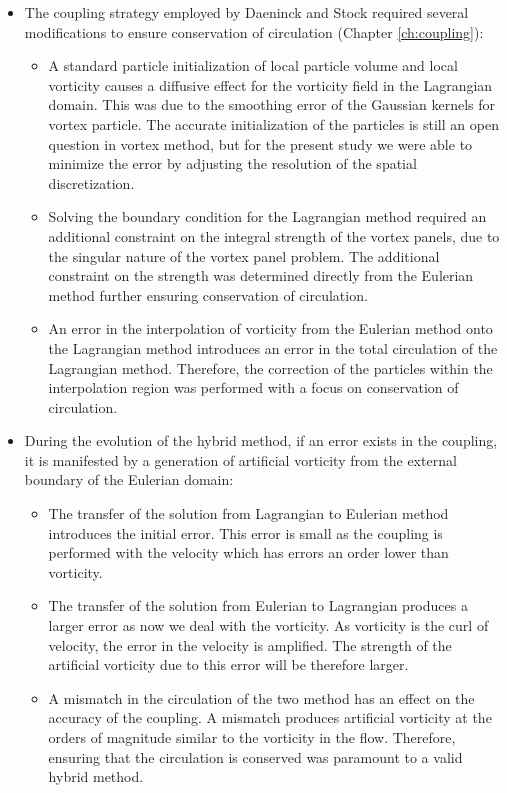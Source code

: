 \begin{itemize}

\item The coupling strategy employed by Daeninck and Stock required several modifications to ensure conservation of circulation (Chapter \ref{ch:coupling}):
	\begin{itemize}
	\item A standard particle initialization of local particle volume and local vorticity causes a diffusive effect for the vorticity field in the Lagrangian domain. This was due to the smoothing error of the Gaussian kernels for vortex particle. The accurate initialization of the particles is still an open question in vortex method, but for the present study we were able to minimize the error by adjusting the resolution of the spatial discretization. 

	\item Solving the boundary condition for the Lagrangian method required an additional constraint on the integral strength of the vortex panels, due to the singular nature of the vortex panel problem.  The additional constraint on the strength was determined directly from the Eulerian method further ensuring conservation of circulation.
	
	\item An error in the interpolation of vorticity from the Eulerian method onto the Lagrangian method introduces an error in the total circulation of the Lagrangian method. Therefore, the correction of the particles within the interpolation region was performed with a focus on conservation of circulation.
	\end{itemize}
	
\item During the evolution of the hybrid method, if an error exists in the coupling, it is manifested by a generation of artificial vorticity from the external boundary of the Eulerian domain:
	\begin{itemize}
	\item The transfer of the solution from Lagrangian to Eulerian method introduces the initial error. This error is small as the coupling is performed with the velocity which has errors an order lower than vorticity.
	\item The transfer of the solution from Eulerian to Lagrangian produces a larger error as now we deal with the vorticity. As vorticity is the curl of velocity, the error in the velocity is amplified. The strength of the artificial vorticity due to this error will be therefore larger.
	\item A mismatch in the circulation of the two method has an effect on the accuracy of the coupling. A mismatch produces artificial vorticity at the orders of magnitude similar to the vorticity in the flow. Therefore, ensuring that the circulation is conserved was paramount to a valid hybrid method.
	\end{itemize}



\end{itemize}
